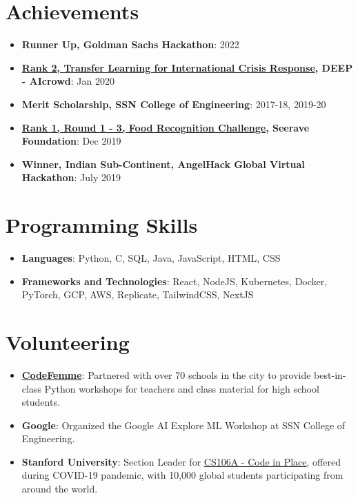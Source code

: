 \documentclass[letterpaper,11pt]{article}
\newcommand{\resumeItem}[2]{
  \item\small{
    \textbf{#1}{: #2 \vspace{-2pt}}
  }
}
\newcommand{\resumeSubItem}[2]{\resumeItem{#1}{#2}\vspace{-4pt}}
\newcommand{\resumeSubHeadingListStart}{\begin{itemize}[leftmargin=*]}
\newcommand{\resumeSubHeadingListEnd}{\end{itemize}}
\begin{document}
\section{Achievements}
  \resumeSubHeadingListStart
   \resumeSubItem
  {Runner Up, Goldman Sachs Hackathon}{2022}
   \resumeSubItem
  {\href{https://bit.ly/AMLDPresentationDEEP}{Rank 2, Transfer Learning for International Crisis Response}, DEEP - AIcrowd}{Jan 2020}
    \resumeSubItem
  {Merit Scholarship, SSN College of Engineering}{2017-18, 2019-20}
  \resumeSubItem
  {\href{https://www.aicrowd.com/challenges/food-recognition-challenge/leaderboards?challenge_round_id=116}{Rank 1, Round 1 - 3, Food Recognition Challenge}, Seerave Foundation}{Dec 2019}
     \resumeSubItem
  {Winner, Indian Sub-Continent, AngelHack Global Virtual Hackathon}{July 2019}
  \resumeSubHeadingListEnd


\section{Programming Skills}
  \resumeSubHeadingListStart
   \item{
     \textbf{Languages}{: Python, C,  SQL, Java, JavaScript, HTML, CSS}
      }
      \item{
       \textbf{Frameworks and Technologies}{: React, NodeJS, Kubernetes, Docker, PyTorch, GCP, AWS, Replicate, TailwindCSS, NextJS}
    }
  \resumeSubHeadingListEnd

\section{Volunteering}
\resumeSubHeadingListStart
\resumeItem{\href{https://codefemme.github.io/}{CodeFemme}}{Partnered with over 70 schools in the city to provide best-in-class Python workshops for teachers and class material for high school students.}
\resumeItem{Google}{Organized the Google AI Explore ML Workshop at SSN College of Engineering.}
\resumeItem{Stanford University}{Section Leader for \href{https://codeinplace.stanford.edu/}{CS106A - Code in Place}, offered during COVID-19 pandemic, with 10,000 global students participating from around the world.}
\resumeSubHeadingListEnd
\end{document}

